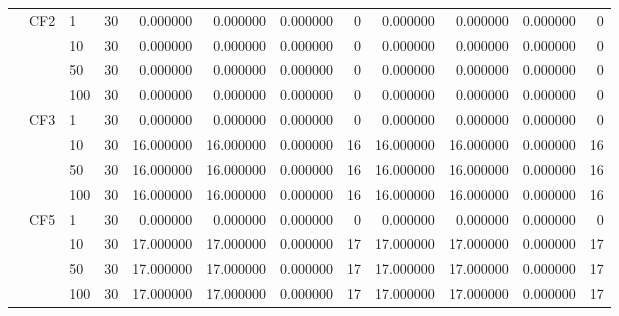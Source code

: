 \begin{tabular}{lllrrrrrrrrr}
\cline{2-12}
 & \multirow[t]{4}{*}{CF2} & 1 & 30 & 0.000000 & 0.000000 & 0.000000 & 0 & 0.000000 & 0.000000 & 0.000000 & 0 \\
 &  & 10 & 30 & 0.000000 & 0.000000 & 0.000000 & 0 & 0.000000 & 0.000000 & 0.000000 & 0 \\
 &  & 50 & 30 & 0.000000 & 0.000000 & 0.000000 & 0 & 0.000000 & 0.000000 & 0.000000 & 0 \\
 &  & 100 & 30 & 0.000000 & 0.000000 & 0.000000 & 0 & 0.000000 & 0.000000 & 0.000000 & 0 \\
\cline{2-12}
 & \multirow[t]{4}{*}{CF3} & 1 & 30 & 0.000000 & 0.000000 & 0.000000 & 0 & 0.000000 & 0.000000 & 0.000000 & 0 \\
 &  & 10 & 30 & 16.000000 & 16.000000 & 0.000000 & 16 & 16.000000 & 16.000000 & 0.000000 & 16 \\
 &  & 50 & 30 & 16.000000 & 16.000000 & 0.000000 & 16 & 16.000000 & 16.000000 & 0.000000 & 16 \\
 &  & 100 & 30 & 16.000000 & 16.000000 & 0.000000 & 16 & 16.000000 & 16.000000 & 0.000000 & 16 \\
\cline{2-12}
 & \multirow[t]{4}{*}{CF5} & 1 & 30 & 0.000000 & 0.000000 & 0.000000 & 0 & 0.000000 & 0.000000 & 0.000000 & 0 \\
 &  & 10 & 30 & 17.000000 & 17.000000 & 0.000000 & 17 & 17.000000 & 17.000000 & 0.000000 & 17 \\
 &  & 50 & 30 & 17.000000 & 17.000000 & 0.000000 & 17 & 17.000000 & 17.000000 & 0.000000 & 17 \\
 &  & 100 & 30 & 17.000000 & 17.000000 & 0.000000 & 17 & 17.000000 & 17.000000 & 0.000000 & 17 \\
\cline{1-12} \cline{2-12}
\bottomrule
\end{tabular}
